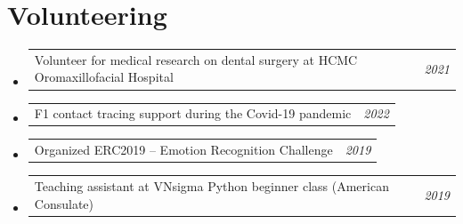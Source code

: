 \documentclass[10pt,a4paper]{article}
\makeatletter
\newcommand{\cvline}[2]{%
  \noindent
  \begin{tabular*}{\linewidth}{@{}l@{\extracolsep{\fill}}r@{}}
    #1 & \textit{\small #2}
  \end{tabular*}%
}
\makeatother
\begin{document}
\section{Volunteering}

\begin{itemize}
  \item \cvline{Volunteer for medical research on dental surgery at HCMC Oromaxillofacial Hospital}{2021}
  \item \cvline{F1 contact tracing support during the Covid-19 pandemic}{2022}
  \item \cvline{Organized ERC2019 -- Emotion Recognition Challenge}{2019}
  \item \cvline{Teaching assistant at VNsigma Python beginner class (American Consulate)}{2019}
\end{itemize}
\end{document}
